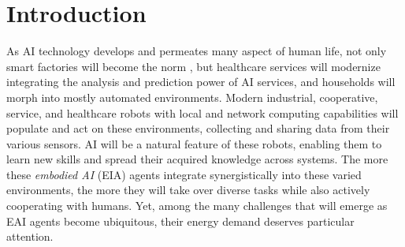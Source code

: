 \documentclass[12pt]{article}
\renewcommand{\emph}[1]{\textit{#1}}
\begin{document}

\newcommand{\beginsupplement}
{%
	\setcounter{table}{0}
	\renewcommand{\thesection}{S\arabic{section}}
	\renewcommand{\thetable}{S\arabic{table}}%
	\setcounter{figure}{0}
	\renewcommand{\thefigure}{S\arabic{figure}}%
}


\section*{Introduction}\label{sec:intro}
As AI technology develops and permeates many aspect of human life, not only smart factories will become the norm \cite{Szczepanski2019Economicimpactsartificial}, but healthcare services will modernize integrating the analysis and prediction power of AI services, and households will morph into mostly automated environments. Modern industrial, cooperative, service, and healthcare robots with local and network computing capabilities will populate and act on these environments, collecting and sharing data from their various sensors. AI will be a natural feature of these robots, enabling them to learn new skills and spread their acquired knowledge across systems. The more these \emph{embodied AI} (EIA) agents integrate synergistically into these varied environments, the more they will take over diverse tasks while also actively cooperating with humans. Yet, among the many challenges that will emerge as EAI agents become ubiquitous, their energy demand deserves particular attention.
\end{document}
